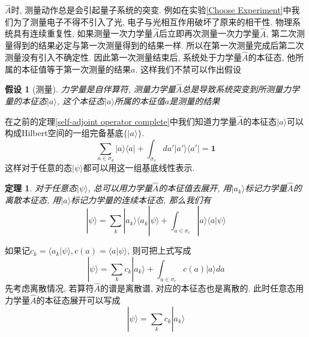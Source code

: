 \documentclass[a4paper,11pt]{book}
\newtheorem{theorem}{\hspace{2em}定理}[section]
\newtheorem{hypothesis}{假设}[section]
\begin{document}
$\hat{A}$时, 测量动作总是会引起量子系统的突变. 例如在实验\ref{Choose Experiment}中我们为了测量电子不得不引入了光, 电子与光相互作用破坏了原来的相干性. 物理系统具有连续重复性, 如果测量一次力学量$\hat{A}$后立即再次测量一次力学量$\hat{A}$, 第二次测量得到的结果必定与第一次测量得到的结果一样. 所以在第一次测量完成后第二次测量没有引入不确定性. 因此第一次测量结束后, 系统处于力学量$\hat{A}$的本征态, 他所属的本征值等于第一次测量的结果$a$. 这样我们不禁可以作出假设
\begin{hypothesis}[测量]\label{measure hyp}
  力学量是自伴算符, 测量力学量$\hat{A}$总是导致系统突变到所测量力学量的本征态$|a\rangle$, 这个本征态$|a\rangle$所属的本征值$a$是测量的结果
\end{hypothesis}
在之前的定理\ref{self-adjoint operator complete}中我们知道力学量$\hat{A}$的本征态$|a\rangle$可以构成Hilbert空间的一组完备基底$\{|a\rangle\}$.
\begin{equation*}
  \sum_{a\in\sigma_d}|a\rangle\langle a|+\int_{\sigma_e}da'|a'\rangle\langle a'|=\mathbf{1}
\end{equation*}
这样对于任意的态$|\psi\rangle$都可以用这一组基底线性表示.
\begin{theorem}
  对于任意态$|\psi\rangle$, 总可以用力学量$\hat{A}$的本征值去展开, 用$|a_k\rangle$标记力学量$\hat{A}$的离散本征态, 用$|a\rangle$标记力学量的连续本征态, 那么我们有
  \begin{equation*}
    |\psi\rangle=\sum_{k}|a_k\rangle\langle a_k|\psi\rangle+\int_{a\in\sigma_e}|a\rangle\langle a|\psi\rangle
  \end{equation*}
\end{theorem}
如果记$c_k=\langle a_k|\psi\rangle, c(a)=\langle a|\psi\rangle$, 则可把上式写成
\begin{equation*}
  |\psi\rangle=\sum_{k}c_k|a_k\rangle+\int_{a\in\sigma_e}c(a)|a\rangle da
\end{equation*}
先考虑离散情况, 若算符$\hat{A}$的谱是离散谱, 对应的本征态也是离散的. 此时任意态用力学量$\hat{A}$的本征态展开可以写成
\begin{equation*}
  |\psi\rangle=\sum_{k}c_k|a_k\rangle
\end{equation*}
\end{document}
